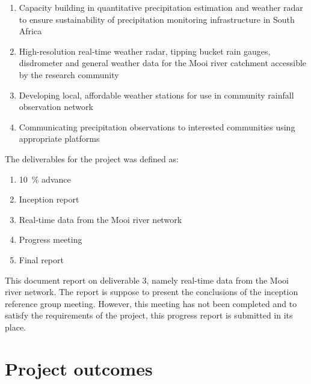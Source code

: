 \documentclass{wrcreport}
\begin{document}
\begin{enumerate}
\item Capacity building in quantitative precipitation estimation and
    weather radar to ensure sustainability of precipitation monitoring
    infrastructure in South Africa \item High-resolution real-time weather
    radar, tipping bucket rain gauges, disdrometer and general weather
    data for the Mooi river catchment accessible by the research community
\item Developing local, affordable weather stations for use in community rainfall observation network
\item Communicating precipitation observations to interested communities using appropriate platforms
\end{enumerate}

The deliverables for the project was defined as:

\begin{enumerate}
\item \SI{10}{\percent} advance
\item Inception report
\item Real-time data from the Mooi river network 
\item Progress meeting 
\item Final report
\end{enumerate}

This document report on deliverable 3, namely real-time data from the
Mooi river network. The report is suppose to present the conclusions
of the inception reference group meeting. However, this meeting has
not been completed and to satisfy the requirements of the project,
this progress report is submitted in its place.

\section{Project outcomes}
\end{document}
